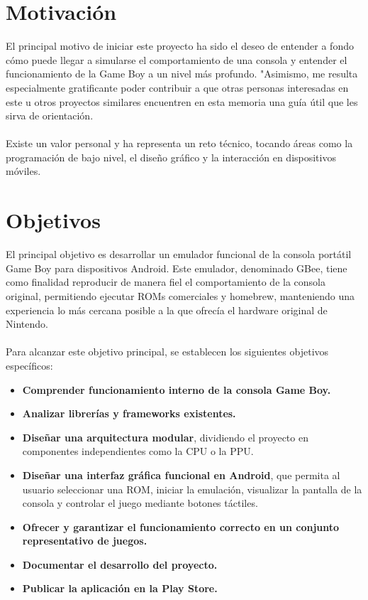 \section{Motivación}
El principal motivo de iniciar este proyecto ha sido el deseo de entender a fondo cómo puede llegar a simularse el comportamiento de una consola y entender el funcionamiento de la Game Boy a un nivel más profundo. "Asimismo, me resulta especialmente gratificante poder contribuir a que otras personas interesadas en este u otros proyectos similares encuentren en esta memoria una guía útil que les sirva de orientación.
\\\\
Existe un valor personal y ha representa un reto técnico, tocando áreas como la programación de bajo nivel, el diseño gráfico y la interacción en dispositivos móviles.

\section{Objetivos}
\label{objetivos}

El principal objetivo es desarrollar un emulador funcional de la consola portátil Game Boy para dispositivos Android. Este emulador, denominado GBee, tiene como finalidad reproducir de manera fiel el comportamiento de la consola original, permitiendo ejecutar ROMs comerciales y homebrew, manteniendo una experiencia lo más cercana posible a la que ofrecía el hardware original de Nintendo.
\\\\
Para alcanzar este objetivo principal, se establecen los siguientes objetivos específicos:

\begin{itemize}
    \item \textbf{Comprender funcionamiento interno de la consola Game Boy.}
    \item \textbf{Analizar librerías y frameworks existentes.}
    \item \textbf{Diseñar una arquitectura modular}, dividiendo el proyecto en componentes independientes como la CPU o la PPU.
    \item \textbf{Diseñar una interfaz gráfica funcional en Android}, que permita al usuario seleccionar una ROM, iniciar la emulación, visualizar la pantalla de la consola y controlar el juego mediante botones táctiles.
    \item \textbf{Ofrecer y garantizar el funcionamiento correcto en un conjunto representativo de juegos.}
    \item \textbf{Documentar el desarrollo del proyecto.}
    \item \textbf{Publicar la aplicación en la Play Store.}
\end{itemize}

